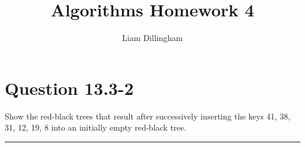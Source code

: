 \documentclass[20pt]{article} %
\title{Algorithms Homework 4}
\author{Liam Dillingham}
\begin{document}
\maketitle

\section{Question 13.3-2} 
Show the red-black trees that result after successively inserting the keys 41, 38, 31, 12, 19, 8 into an initially empty red-black tree. \\
\noindent\rule{2cm}{0.4pt} \\



\begin{table}
\end{table}
\end{document}
